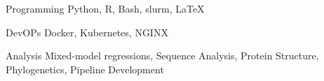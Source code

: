 

\begin{cvskills}

  \cvskill
    {Programming}
	{Python, R, Bash, slurm, LaTeX}

  \cvskill
    {DevOPs}
	{Docker, Kubernetes, NGINX}

  \cvskill
    {Analysis}
	{Mixed-model regressions, Sequence Analysis, Protein Structure, Phylogenetics, Pipeline Development}

\end{cvskills}
